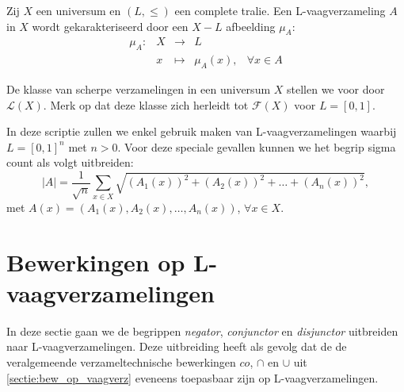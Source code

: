 
\begin{definitie}
Zij $X$ een universum en $(L,\le)$ een complete tralie. Een L-vaagverzameling $A$ in $X$ wordt
gekarakteriseerd door een $X - L$ afbeelding $\mu_A$:
$$
\begin{array}{lllll}
\mu_A: 	& X & \to 		& L	& \\
		& x & \mapsto 	& \mu_A(x),		& \forall x \in A
\end{array}
$$
\end{definitie}
\noindent
De klasse van scherpe verzamelingen in een universum $X$ stellen we voor door 
$\mathcal{L}(X)$. Merk op dat deze klasse zich herleidt tot $\mathcal{F}(X)$ voor $L = [0,1]$.

In deze scriptie zullen we enkel gebruik maken van L-vaagverzamelingen waarbij
$L = [0,1]^n$ met $n > 0$. Voor deze speciale gevallen kunnen we het begrip sigma count als volgt 
uitbreiden:
$$
|A|=\frac{1}{\sqrt{n}}\sum_{x \in X}\sqrt{(A_1(x))^2+(A_2(x))^2+\ldots+(A_n(x))^2},
$$
met $A(x)=(A_1(x),A_2(x),\ldots,A_n(x))$, $\forall x \in X$.  

\section{Bewerkingen op L-vaagverzamelingen}

In deze sectie gaan we de begrippen \emph{negator}, \emph{conjunctor} en 
\emph{disjunctor} uitbreiden naar L-vaag\-ver\-za\-me\-ling\-en. Deze uitbreiding heeft als gevolg dat de
de veralgemeende verzameltechnische bewerkingen $co$, $\cap$ en 
$\cup$ uit \ref{sectie:bew_op_vaagverz} eveneens toepasbaar zijn op L-vaagverzamelingen.

